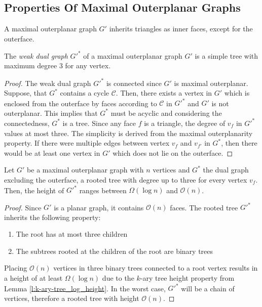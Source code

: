 \subsection{Properties Of Maximal Outerplanar Graphs}
\begin{lemma}
	A maximal outerplanar graph $G'$ inherits triangles as inner faces, except for the outerface.
\end{lemma}
\begin{lemma}\label{l:outerplanar-dual-tree-degree-3}
	The \emph{weak dual graph} $G'^*$ of a maximal outerplanar graph $G'$ is a simple tree with maximum degree 3 for any vertex.
\end{lemma}
\begin{proof}
	The weak dual graph $G'^*$ is connected since $G'$ is maximal outerplanar. Suppose, that $G^*$ contains a cycle $\mathcal{C}$. Then, there exists a vertex in $G'$ which is enclosed from the outerface by faces according to $\mathcal{C}$ in $G'^*$ and $G'$ is not outerplanar. This implies that $G^*$ must be acyclic and considering the connectedness, $G^*$ is a tree. Since any face $f$ is a triangle, the degree of $v_f$ in $G'^*$ values at most three. The simplicity is derived from the maximal outerplanarity property. If there were multiple edges between vertex $v_f$ and $v_{f'}$ in $G^*$, then there would be at least one vertex in $G'$ which does not lie on the outerface.
\end{proof}
\begin{lemma}
	Let $G'$ be a maximal outerplanar graph with $n$ vertices and $G^*$ the dual graph excluding the outerface, a rooted tree with degree up to three for every vertex $v_f$. Then, the height of $G'^*$ ranges between $\Omega(\log n)$ and $\mathcal{O}(n)$.
\end{lemma}
\begin{proof}
	Since $G'$ is a planar graph, it contains $\mathcal{O}(n)$ faces. The rooted tree $G'^*$ inherits the following property:
	\begin{enumerate}
		\item The root has at most three children
		\item The subtrees rooted at the children of the root are binary trees
	\end{enumerate}
	Placing $\mathcal{O}(n)$ vertices in three binary trees connected to a root vertex results in a height of at least $\Omega(\log n)$ due to the $k$-ary tree height property from Lemma \ref{l:k-ary-tree_log_height}. In the worst case, $G'^*$ will be a chain of vertices, therefore a rooted tree with height $\mathcal{O}(n)$.
\end{proof}

